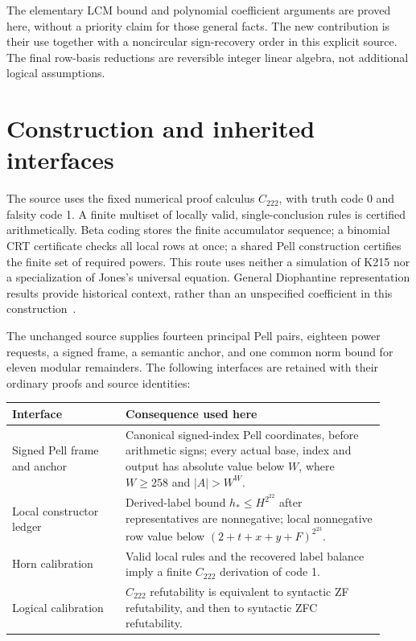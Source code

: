 The elementary LCM bound and polynomial coefficient arguments are proved
here, without a priority claim for those general facts. The new contribution
is their use together with a noncircular sign-recovery order in this explicit
source. The final row-basis reductions are reversible integer linear algebra,
not additional logical assumptions.

\section{Construction and inherited interfaces}\label{sec:interfaces}

The source uses the fixed numerical proof calculus $C_{222}$, with truth
code 0 and falsity code 1. A finite multiset of locally valid, single-conclusion
rules is certified arithmetically. Beta coding stores the finite accumulator
sequence; a binomial CRT certificate checks all local rows at once; a shared
Pell construction certifies the finite set of required powers. This route
uses neither a simulation of K215 nor a specialization of Jones's universal
equation. General Diophantine representation results provide historical
context, rather than an unspecified coefficient in this construction~\cite{jones}.

The unchanged source supplies fourteen principal Pell pairs, eighteen
power requests, a signed frame, a semantic anchor, and one common norm
bound for eleven modular remainders. The following interfaces are retained
with their ordinary proofs and source identities:

\begin{center}\small
\begin{tabular}{p{0.28\linewidth}p{0.64\linewidth}}
\toprule
Interface & Consequence used here\\
\midrule
Signed Pell frame and anchor & Canonical signed-index Pell coordinates,
before arithmetic signs; every actual base, index and output has absolute
value below $W$, where $W\ge258$ and $|A|>W^W$.\\
Local constructor ledger & Derived-label bound $h_*\le H^{2^{22}}$ after
representatives are nonnegative; local nonnegative row value below
$(2+t+x+y+F)^{2^{23}}$.\\
Horn calibration & Valid local rules and the recovered label balance imply
a finite $C_{222}$ derivation of code 1.\\
Logical calibration & $C_{222}$ refutability is equivalent to syntactic ZF
refutability, and then to syntactic ZFC refutability.\\
\bottomrule
\end{tabular}
\end{center}

